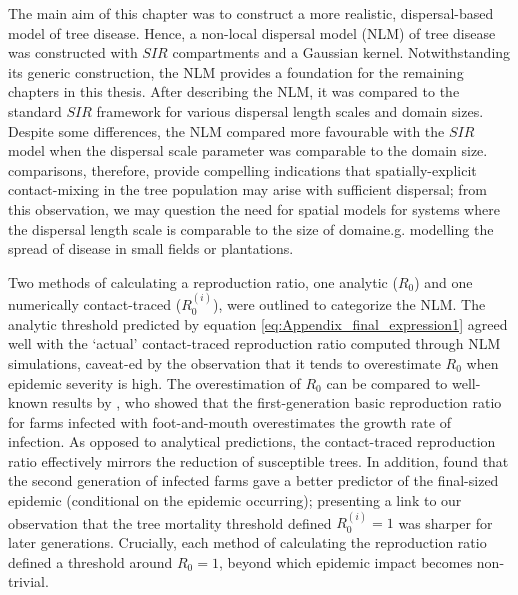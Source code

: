 The main aim of this chapter was to construct a more realistic, dispersal-based model of tree disease.
Hence, a non-local dispersal model (NLM) of tree disease was constructed with $SIR$ compartments and a Gaussian kernel.
Notwithstanding its generic construction, the NLM provides a foundation for the remaining chapters in this thesis.
After describing the NLM, it was compared to the standard $SIR$ framework for various dispersal length scales and domain sizes.
Despite some differences, the NLM compared more favourable with the $SIR$ model when the dispersal scale parameter was comparable to the domain size.
comparisons, therefore, provide compelling indications that spatially-explicit contact-mixing in the tree population may arise with sufficient dispersal;
from this observation, we may question the need for spatial models for systems where the dispersal length scale is comparable to the size of domain\textemdash e.g. modelling the spread of disease in small fields or plantations.

Two methods of calculating a reproduction ratio, one analytic ($R_0$) and one numerically contact-traced ($R_0^{(i)}$), were outlined to categorize the NLM.
The analytic threshold predicted by equation \ref{eq:Appendix_final_expression1} agreed well with the `actual' contact-traced reproduction ratio computed through NLM simulations,
caveat-ed by the observation that it tends to overestimate $R_0$ when epidemic severity is high.
The overestimation of $R_0$ can be compared to well-known results by \cite{R0-perc-ref, doi:10.1098/rsif.2005.0051},
who showed that the first-generation basic reproduction ratio for farms infected with foot-and-mouth overestimates the growth rate of infection.
As opposed to analytical predictions, the contact-traced reproduction ratio effectively mirrors the reduction of susceptible trees. %
In addition, \cite{R0-perc-ref} found that the second generation of infected farms gave a better predictor of the final-sized epidemic (conditional on the epidemic occurring);
presenting a link to our observation that the tree mortality threshold defined $R_0^{(i)}=1$ was sharper for later generations.
Crucially, each method of calculating the reproduction ratio defined a threshold around $R_0=1$, beyond which epidemic impact becomes non-trivial.

